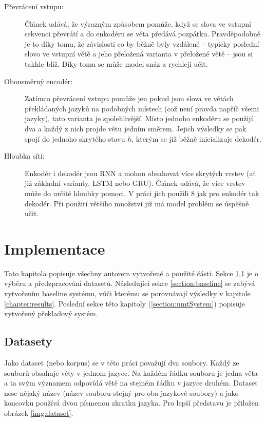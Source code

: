 \begin{description}
  \item[Převrácení vstupu:] \label{desc:revert} Článek \cite{seq2seq} udává, že výrazným způsobem pomůže, když se slova ve vstupní sekvenci převrátí a do enkodéru  se věta předává pozpátku. Pravděpodobně je to díky tomu, že závislosti co by běžně byly vzdálené -- typicky poslední slovo ve vstupní větě a jeho přeložená varianta v přeložené větě -- jsou si takhle blíž. Díky tomu se může model snáz a rychleji učit.
  \item[Obousměrný encodér:] Zatímco převrácení vstupu pomůže jen pokud jsou slova ve větách překládaných jazyků na podobných místech (což není pravda napříč všemi jazyky), tato varianta je spolehlivější. Místo jednoho enkodéru se použijí dva a každý z nich projde větu jedním směrem. Jejich výsledky se pak spojí do jednoho skrytého stavu $h$, kterým se již běžně inicializuje dekodér.
  \item[Hloubka sítí:] Enkodér i dekodér jsou RNN a mohou obsahovat více skrytých vrstev (ať již základní varianty, LSTM nebo GRU). Článek \cite{googleBridgingGap} udává, že více vrstev může do určité hloubky pomoci. V práci jich použili 8 jak pro enkodér tak dekodér. Při použití většího množství již má model problém se úspěšně učit.
\end{description}


\chapter{Implementace} \label{chapter:implementation}
Tato kapitola popisuje všechny autorem vytvořené a použité části. Sekce \ref{section:datasets} je o výběru a předzpracování datasetů. Následující sekce \ref{section:baseline} se zabývá vytvořením baseline systému, vůči kterému se porovnávají výsledky v kapitole \ref{chapter:results}. Poslední sekce této kapitoly (\ref{section:nmtSystem}) popisuje vytvořený překladový systém.

\section{Datasety}\label{section:datasets}
Jako dataset (nebo korpus) se v této práci považují dva soubory. Každý ze souborů obsahuje věty v jednom jazyce. Na každém řádku souboru je jedna věta a ta svým významem odpovídá větě na stejném řádku v jazyce druhém. Dataset nese nějaký název (název souboru stejný pro oba jazykové soubory) a jako koncovku používá dvou písmenou zkratku jazyka. Pro lepší představu je přiložen obrázek \ref{img:dataset}.

